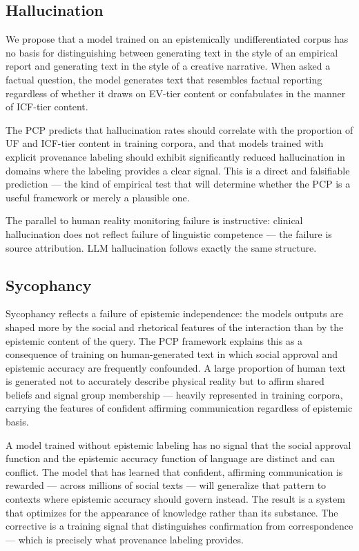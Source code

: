 \documentclass[12pt]{article}
\begin{document}
\subsection{Hallucination}\label{hallucination}

We propose that a model trained on an epistemically undifferentiated
corpus has no basis for distinguishing between generating text in the
style of an empirical report and generating text in the style of a
creative narrative. When asked a factual question, the model generates
text that resembles factual reporting regardless of whether it draws on
EV-tier content or confabulates in the manner of ICF-tier content.

The PCP predicts that hallucination rates should correlate with the
proportion of UF and ICF-tier content in training corpora, and that
models trained with explicit provenance labeling should exhibit
significantly reduced hallucination in domains where the labeling
provides a clear signal. This is a direct and falsifiable prediction ---
the kind of empirical test that will determine whether the PCP is a
useful framework or merely a plausible one.

The parallel to human reality monitoring failure is instructive:
clinical hallucination does not reflect failure of linguistic competence
--- the failure is source attribution. LLM hallucination follows exactly
the same structure.

\subsection{Sycophancy}\label{sycophancy}

Sycophancy reflects a failure of epistemic independence: the
model\textquotesingle s outputs are shaped more by the social and
rhetorical features of the interaction than by the epistemic content of
the query. The PCP framework explains this as a consequence of training
on human-generated text in which social approval and epistemic accuracy
are frequently confounded. A large proportion of human text is generated
not to accurately describe physical reality but to affirm shared beliefs
and signal group membership --- heavily represented in training corpora,
carrying the features of confident affirming communication regardless of
epistemic basis.

A model trained without epistemic labeling has no signal that the social
approval function and the epistemic accuracy function of language are
distinct and can conflict. The model that has learned that confident,
affirming communication is rewarded --- across millions of social texts
--- will generalize that pattern to contexts where epistemic accuracy
should govern instead. The result is a system that optimizes for the
appearance of knowledge rather than its substance. The corrective is a
training signal that distinguishes confirmation from correspondence ---
which is precisely what provenance labeling provides.
\end{document}
